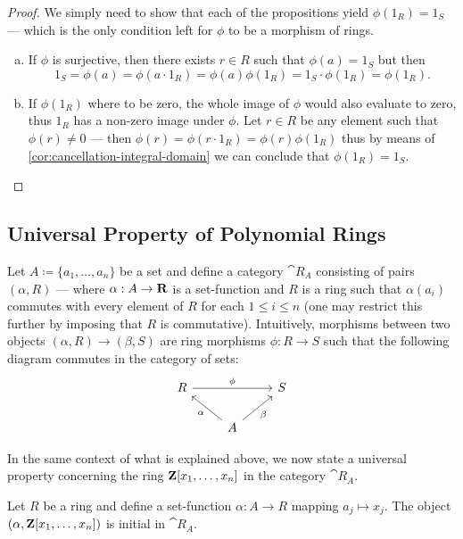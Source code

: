 %
\begin{proof}
We simply need to show that each of the propositions yield \(\phi(1_R) = 1_S\)
--- which is the only condition left for \(\phi\) to be a morphism of rings.
\begin{enumerate}[(a)]\setlength\itemsep{0em}
\item If \(\phi\) is surjective, then there exists \(r \in R\) such that
  \(\phi(a) = 1_S\) but then
  \[
  1_S = \phi(a) = \phi(a \cdot 1_R) = \phi(a) \phi(1_R)
  = 1_S \cdot \phi(1_R) = \phi(1_R).
  \]

\item If \(\phi(1_R)\) where to be zero, the whole image of \(\phi\) would also
  evaluate to zero, thus \(1_R\) has a non-zero image under \(\phi\). Let
  \(r \in R\) be any element such that \(\phi(r) \neq 0\) --- then
  \(\phi(r) = \phi(r \cdot 1_R) = \phi(r) \phi(1_R)\) thus by means of
  \cref{cor:cancellation-integral-domain} we can conclude that
  \(\phi(1_R) = 1_S\).
\end{enumerate}
\end{proof}
%

\subsection{Universal Property of Polynomial Rings}

Let \(A \coloneq \{a_1, \dots, a_n\}\) be a set and define a category
\(\cat R_A\) consisting of pairs \((\alpha, R)\) --- where \(\alpha: A \to \mathbf{R}\)
is a set-function and \(R\) is a ring such that \(\alpha(a_i)\) commutes with
every element of \(R\) for each \(1 \leq i \leq n\) (one may restrict this
further by imposing that \(R\) is commutative). Intuitively, morphisms between
two objects \((\alpha, R) \to (\beta, S)\) are ring morphisms \(\phi: R \to S\)
such that the following diagram commutes in the category of sets:
\[
\begin{tikzcd}
R \ar[rr, "\phi"] & &S \\
&A \ar[lu, "\alpha"] \ar[ru, swap, "\beta"] &
\end{tikzcd}
\]

In the same context of what is explained above, we now state a universal
property concerning the ring \(\mathbf{Z}[x_1, \dots, x_n]\) in the category
\(\cat R_A\).

%
\begin{proposition}
\label{prop:Z[several]-initial-polynomial-rings}
Let \(R\) be a ring and define a set-function \(\alpha: A \to R\) mapping
\(a_j \mapsto x_j\). The object \((\alpha, \mathbf{Z}[x_1, \dots, x_n])\) is initial in
\(\cat R_A\).
\end{proposition}
%


